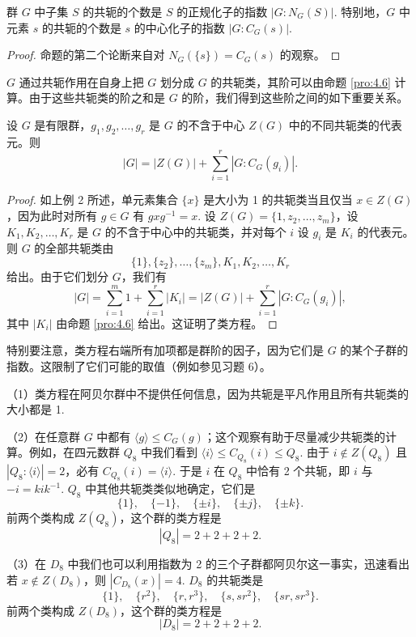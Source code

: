 \begin{proposition}\label{pro:4.6}
群 \(G\) 中子集 \(S\) 的共轭的个数是 \(S\) 的正规化子的指数 \(|G : N_G(S)|\). 特别地，\(G\) 中元素 \(s\) 的共轭的个数是 \(s\) 的中心化子的指数 \(|G : C_G(s)|\).
\end{proposition}

\begin{proof}
命题的第二个论断来自对 \(N_G(\{s\}) = C_G(s)\) 的观察。
\end{proof}

\(G\) 通过共轭作用在自身上把 \(G\) 划分成 \(G\) 的共轭类，其阶可以由命题 \ref{pro:4.6} 计算。由于这些共轭类的阶之和是 \(G\) 的阶，我们得到这些阶之间的如下重要关系。

\begin{theorem}[类方程]\label{thm:4.7}
设 \(G\) 是有限群，\(g_1, g_2, \ldots, g_r\) 是 \(G\) 的不含于中心 \(Z(G)\) 中的不同共轭类的代表元。则
\[
|G| = |Z(G)| + \sum_{i=1}^{r} |G : C_G(g_i)|.
\]
\end{theorem}

\begin{proof}
如上例 2 所述，单元素集合 \(\{x\}\) 是大小为 1 的共轭类当且仅当 \(x \in Z(G)\)，因为此时对所有 \(g \in G\) 有 \(gxg^{-1} = x\). 设 \(Z(G) = \{1, z_2, \ldots, z_m\}\)，设 \(K_1, K_2, \ldots, K_r\) 是 \(G\) 的不含于中心中的共轭类，并对每个 \(i\) 设 \(g_i\) 是 \(K_i\) 的代表元。则 \(G\) 的全部共轭类由
\[
\{1\}, \{z_2\}, \ldots, \{z_m\}, K_1, K_2, \ldots, K_r
\]
给出。由于它们划分 \(G\)，我们有
\[
|G| = \sum_{i=1}^{m} 1 + \sum_{i=1}^{r} |K_i| = |Z(G)| + \sum_{i=1}^{r} |G : C_G(g_i)|,
\]
其中 \(|K_i|\) 由命题 \ref{pro:4.6} 给出。这证明了类方程。
\end{proof}

特别要注意，类方程右端所有加项都是群阶的因子，因为它们是 \(G\) 的某个子群的指数。这限制了它们可能的取值（例如参见习题 6）。

\begin{example}
（1）类方程在阿贝尔群中不提供任何信息，因为共轭是平凡作用且所有共轭类的大小都是 1.

（2）在任意群 \(G\) 中都有 \(\langle g \rangle \leq C_G(g)\)；这个观察有助于尽量减少共轭类的计算。例如，在四元数群 \(Q_8\) 中我们看到 \(\langle i \rangle \leq C_{Q_8}(i) \leq Q_8\). 由于 \(i \notin Z(Q_8)\) 且 \(|Q_8 : \langle i \rangle| = 2\)，必有 \(C_{Q_8}(i) = \langle i \rangle\). 于是 \(i\) 在 \(Q_8\) 中恰有 2 个共轭，即 \(i\) 与 \(-i = kik^{-1}\). \(Q_8\) 中其他共轭类类似地确定，它们是
\[
\{1\},\quad \{-1\},\quad \{\pm i\},\quad \{\pm j\},\quad \{\pm k\}.
\]
前两个类构成 \(Z(Q_8)\)，这个群的类方程是
\[
|Q_8| = 2 + 2 + 2 + 2.
\]

（3）在 \(D_8\) 中我们也可以利用指数为 2 的三个子群都阿贝尔这一事实，迅速看出若 \(x \notin Z(D_8)\)，则 \(|C_{D_8}(x)| = 4\). \(D_8\) 的共轭类是
\[
\{1\},\quad \{r^2\},\quad \{r, r^3\},\quad \{s, sr^2\},\quad \{sr, sr^3\}.
\]
前两个类构成 \(Z(D_8)\)，这个群的类方程是
\[
|D_8| = 2 + 2 + 2 + 2.
\]
\end{example}

